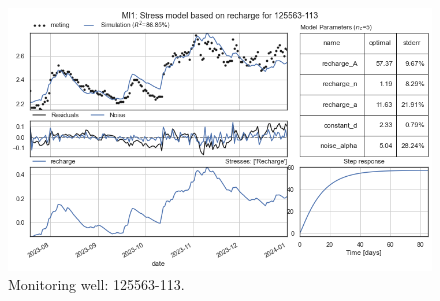 \begin{figure}[htbp]
\begin{minipage}{0.32\textwidth}
        \centering
        \includegraphics[width=\linewidth]{frontmatter/Heijplaat-fig/9.png}
        \caption{Monitoring well: 125563-113.}
        \label{SM: 125563-113}
    \end{minipage}
\end{figure}

